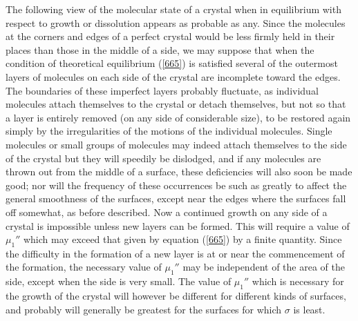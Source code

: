 \documentclass[12pt]{article}
\begin{document}
{The following view of the molecular state of a crystal when in equilibrium with respect to growth or dissolution appears as probable as any. Since the molecules at the corners and edges of a perfect crystal would be less firmly held in their places than those in the middle of a side, we may suppose that when the condition of theoretical equilibrium (\ref{665}) is satisfied several of the outermost layers of molecules on each side of the crystal are incomplete toward the edges. The boundaries of these imperfect layers probably fluctuate, as individual molecules attach themselves to the crystal or detach themselves, but not so that a layer is entirely removed (on any side of considerable size), to be restored again simply by the irregularities of the motions of the individual molecules.  Single molecules or small groups of molecules may indeed attach themselves to the side of the crystal but they will speedily be dislodged, and if any molecules are thrown out from the middle of a surface, these deficiencies will also soon be made good; nor will the frequency of these occurrences be such as greatly to affect the general smoothness of the surfaces, except near the edges where the surfaces fall off somewhat, as before described. Now a continued growth on any side of a crystal is impossible unless new layers can be formed. This will require a value of $\mu_1''$ which may exceed that given by equation (\ref{665}) by a finite quantity. Since the difficulty in the formation of a new layer is at or near the commencement of the formation, the necessary value of $\mu_1''$ may be independent of the area of the side, except when the side is very small. The value of $\mu_1''$ which is necessary for the growth of the crystal will however be different for different kinds of surfaces, and probably will generally be greatest for the surfaces for which $\sigma$ is least.

}
\end{document}
